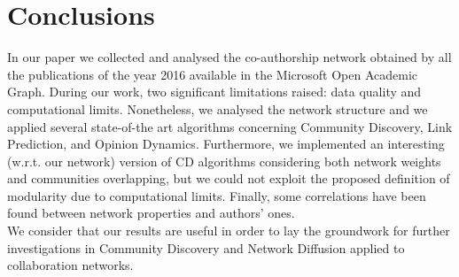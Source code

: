 \documentclass[sigchi]{acmart}
\begin{document}
\section{Conclusions}
In our paper we collected and analysed the co-authorship network obtained by all the publications of the year 2016 available in the Microsoft Open Academic Graph.
During our work, two significant limitations raised: data quality and computational limits. Nonetheless, we analysed the network structure and we applied several state-of-the art algorithms concerning Community Discovery, Link Prediction, and Opinion Dynamics. Furthermore, we implemented an interesting (w.r.t. our network) version of CD algorithms considering both network weights and communities overlapping, but we could not exploit the proposed definition of modularity due to computational limits. Finally, some correlations have been found between network properties and authors' ones. \\
We consider that our results are useful in order to lay the groundwork for further investigations in Community Discovery and Network Diffusion applied to collaboration networks.



\end{document}
